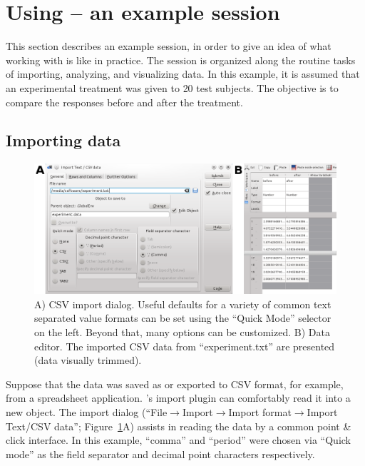 \section[Using RKWard -- an example session]{Using  -- an example session}
\label{sec:using_RKWard}
This section describes an example  session, in order to give an idea
of what working with  is like in practice.
The session is organized along the routine tasks of importing,
analyzing, and visualizing data. In this example, it is assumed that an experimental
treatment was given to 20 test subjects. The objective is to compare the responses 
before and after the treatment. 

\subsection{Importing data}
\label{sec:importing_data}
\begin{figure}[b!]
 \centering
 \includegraphics[width=13.5cm]{./figures/import_data.png}
 \caption{A) CSV import dialog. Useful defaults for a variety of common text separated value formats can
  be set using the ``Quick Mode'' selector on the left. Beyond that, many options can be customized. B) Data editor. The imported CSV
  data from ``experiment.txt'' are presented (data visually trimmed).}
 \label{fig:import_data}
\end{figure}

Suppose that the data was saved as or exported to CSV format, for example, from a 
spreadsheet application. 's import plugin can
comfortably read it into a new  object.
The import dialog (``File$\rightarrow$Import$\rightarrow$Import
format$\rightarrow$Import Text/CSV data''; Figure~\ref{fig:import_data}A) assists in reading the
data by a common point \& click interface. In this
example, ``comma'' and ``period'' were chosen via ``Quick mode'' as the field
separator and decimal point characters respectively.

